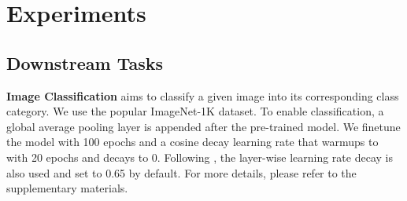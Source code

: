 \documentclass[letterpaper]{article} \usepackage{aaai23}  \usepackage{times}  \usepackage{helvet}  \usepackage{courier}  \usepackage[hyphens]{url}  \usepackage{graphicx} \urlstyle{rm} \def\UrlFont{\rm}  \usepackage{natbib}  \usepackage{caption} \frenchspacing  \setlength{\pdfpagewidth}{8.5in}  \setlength{\pdfpageheight}{11in}  \usepackage{algorithm}
\begin{document}
\section{Experiments}

\subsection{Downstream Tasks}

\noindent \textbf{Image Classification} aims to classify a given image into its corresponding class category. We use the popular ImageNet-1K dataset.
To enable classification,
a global average pooling layer is appended after the pre-trained model.
We finetune the model with 100 epochs and a cosine decay learning rate that warmups to  with 20 epochs and decays to 0.
Following \cite{bao2021beit}, the layer-wise learning rate decay is also used and set to 0.65 by default. For more details, please refer to the supplementary materials.


\begin{table}[t]
\centering
\small
{}
\caption{Image classification accuracy (\%) comparison on ImageNet-K (IN-K) of different self-supervised methods using various backbones. We report Top-1 accuracy and our method PeCo outperforms previous self-supervised methods.}
\label{tbl:cls:imagenet}
\end{table}
\end{document}
